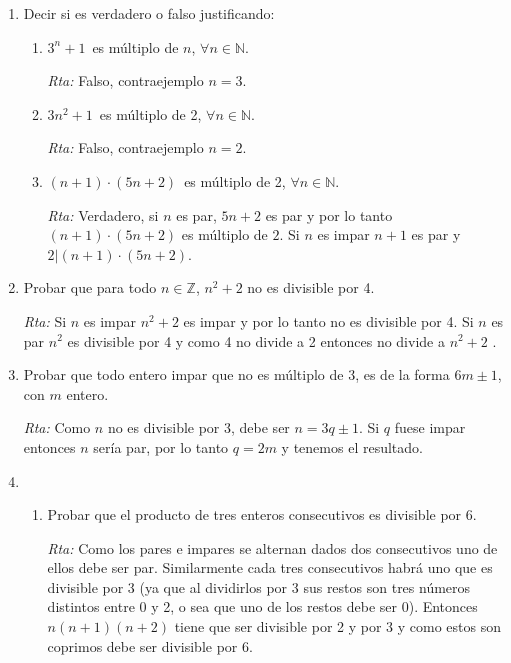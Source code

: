 \documentclass[12pt,spanish,makeidx]{amsbook}
\newcommand{\rta}{\noindent\textit{Rta: }}
\begin{document}
\begin{enumerate}
\begin{enumerate}
\end{enumerate}

\smallskip

\item Decir si es verdadero o falso justificando:
\begin{enumerate}
	\item $3^n+1$\, es múltiplo de $n$, $\forall n \in {\mathbb N}$.
	
	\rta Falso, contraejemplo $n=3$.
	
	\item $3n^2+1$\, es múltiplo de 2, $\forall n \in {\mathbb N}$.
	
	\rta Falso, contraejemplo $n=2$.
	
	\item $(n+1)\cdot (5n+2)$\, es múltiplo de 2, $\forall n \in {\mathbb N}$.
	
	\rta Verdadero, si $n$ es par,  $5n+2$ es par y por lo tanto $(n + 1) \cdot (5n + 2)$ es múltiplo de $2$.	Si $n$ es impar $n+1$ es par y $2\vert (n + 1) \cdot (5n + 2)$.
\end{enumerate}

\smallskip

\item Probar que para todo $n \in {\mathbb Z}$, $n^2 + 2$ no es divisible por 4.

\rta Si $n$ es impar $n^2+2$ es impar y por lo tanto no es divisible por 4.
Si $n$ es par $n^2$ es divisible por 4 y como 4 no divide a 2 entonces no divide a $n^2+2$ .

\smallskip
\item Probar que todo entero impar que no es múltiplo de 3, es de la forma $6m\pm 1$, con $m$ entero.

\rta Como $n$ no es divisible por 3, debe ser $n=3q\pm1$. Si $q$ fuese impar entonces $n$ sería par, por lo tanto $q=2m$  y tenemos el resultado.

\smallskip

\item 
\begin{enumerate}
	\item Probar que el producto de tres enteros consecutivos es divisible por 6.
	
	\rta Como los pares e impares se alternan dados dos consecutivos uno de ellos debe ser par. 
	Similarmente cada tres consecutivos habrá uno que es divisible por 3 (ya que al dividirlos por 3 sus restos son tres números distintos entre 0 y 2, o sea que uno de los restos debe ser 0). Entonces $n(n+1)(n+2)$ tiene que ser divisible por 2 y por 3 y como estos son coprimos debe ser divisible por 6.
	

\end{enumerate}
\end{enumerate}
\end{document}
